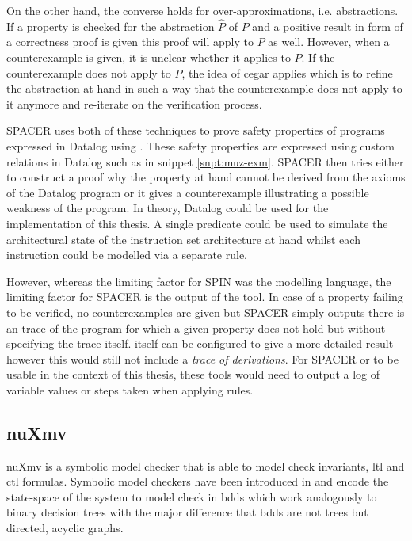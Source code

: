 On the other hand, the converse holds for over-approximations, i.e. abstractions.
If a property is checked for the abstraction $ \hat{P} $ of $ P $ and a positive result in form of a correctness proof is given this proof will apply to $ P $ as well.
However, when a counterexample is given, it is unclear whether it applies to $ P $.
If the counterexample does not apply to $ P $, the idea of \gls{cegar} \cite{Clark00} applies which is to refine the abstraction at hand in such a way that the counterexample does not apply to it anymore and re-iterate on the verification process.

SPACER uses both of these techniques to prove safety properties of programs expressed in Datalog using \muZ{}.
These safety properties are expressed using custom relations in Datalog such as  in snippet \ref{snpt:muz-exm}.
SPACER then tries either to construct a proof why the property at hand cannot be derived from the axioms of the Datalog program or it gives a counterexample illustrating a possible weakness of the program.
In theory, Datalog could be used for the implementation of this thesis.
A single predicate could be used to simulate the architectural state of the instruction set architecture at hand whilst each instruction could be modelled via a separate rule.

However, whereas the limiting factor for SPIN was the modelling language, the limiting factor for SPACER is the output of the tool.
In case of a property failing to be verified, no counterexamples are given but SPACER simply outputs there is an trace of the program for which a given property does not hold but without specifying the trace itself.
\muZ{} itself can be configured to give a more detailed result however this would still not include a \textit{trace of derivations}.
For SPACER or \muZ{} to be usable in the context of this thesis, these tools would need to output a log of variable values or steps taken when applying rules.

\subsection{nuXmv}
\label{sec:nuxmv}

nuXmv \cite{Cavada14} is a symbolic model checker that is able to model check invariants, \gls{ltl} and \gls{ctl} formulas.
Symbolic model checkers have been introduced in \cite{Burch92} and encode the state-space of the system to model check in \glspl{bdd} which work analogously to binary decision trees with the major difference that \glspl{bdd} are not trees but directed, acyclic graphs.

